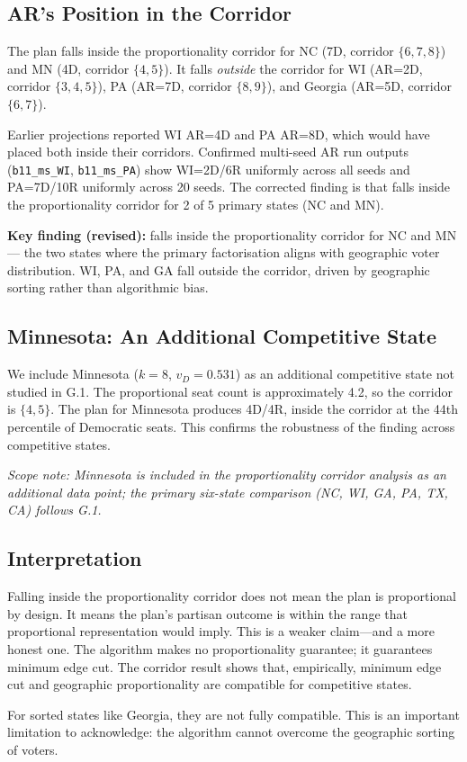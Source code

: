 \subsection{AR's Position in the Corridor}

The \ar{} plan falls inside the proportionality corridor for NC (7D,
corridor $\{6,7,8\}$) and MN (4D, corridor $\{4,5\}$).
It falls \emph{outside} the corridor for WI (AR=2D, corridor $\{3,4,5\}$),
PA (AR=7D, corridor $\{8,9\}$), and Georgia (AR=5D, corridor $\{6,7\}$).

\begin{remark}
Earlier projections reported WI AR=4D and PA AR=8D, which would have placed
both inside their corridors.  Confirmed multi-seed AR run outputs
(\texttt{b11\_ms\_WI}, \texttt{b11\_ms\_PA}) show WI=2D/6R uniformly across
all seeds and PA=7D/10R uniformly across 20 seeds.  The corrected finding
is that \ar{} falls inside the proportionality corridor for 2 of 5 primary
states (NC and MN).
\end{remark}

\begin{keybox}
\textbf{Key finding (revised):} \ar{} falls inside the proportionality
corridor for NC and MN --- the two states where the primary factorisation
aligns with geographic voter distribution.  WI, PA, and GA fall outside the
corridor, driven by geographic sorting rather than algorithmic bias.
\end{keybox}

\subsection{Minnesota: An Additional Competitive State}

We include Minnesota ($k = 8$, $v_D = 0.531$) as an additional competitive
state not studied in G.1.  The proportional seat count is approximately 4.2,
so the corridor is $\{4, 5\}$.  The \ar{} plan for Minnesota produces 4D/4R,
inside the corridor at the 44th percentile of Democratic seats.  This
confirms the robustness of the finding across competitive states.

\textit{Scope note: Minnesota is included in the proportionality corridor analysis as an additional data point; the primary six-state comparison (NC, WI, GA, PA, TX, CA) follows G.1.}

\subsection{Interpretation}

Falling inside the proportionality corridor does not mean the plan is
proportional by design.  It means the plan's partisan outcome is within
the range that proportional representation would imply.  This is a weaker
claim---and a more honest one.  The \ar{} algorithm makes no proportionality
guarantee; it guarantees minimum edge cut.  The corridor result shows that,
empirically, minimum edge cut and geographic proportionality are compatible
for competitive states.

For sorted states like Georgia, they are not fully compatible.  This is an
important limitation to acknowledge: the \ar{} algorithm cannot overcome
the geographic sorting of voters.
